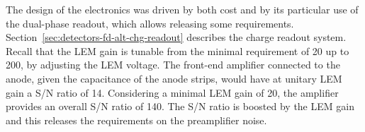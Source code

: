 The design of the electronics was driven by both cost %
and by its  
particular use of the dual-phase readout, which allows releasing
some requirements. 
Section~\ref{sec:detectors-fd-alt-chg-readout} describes the charge readout system. 
 Recall that the LEM gain is tunable from the minimal requirement of 20 up to
200, by adjusting the LEM voltage. %
The front-end
amplifier connected to the anode, given the capacitance of the anode
strips, would have at unitary LEM gain a S/N ratio of
14. Considering a minimal LEM gain of 20, the amplifier provides an
overall S/N ratio of 140. The S/N ratio is boosted by the
LEM gain  and this releases the requirements on the preamplifier
noise. 

